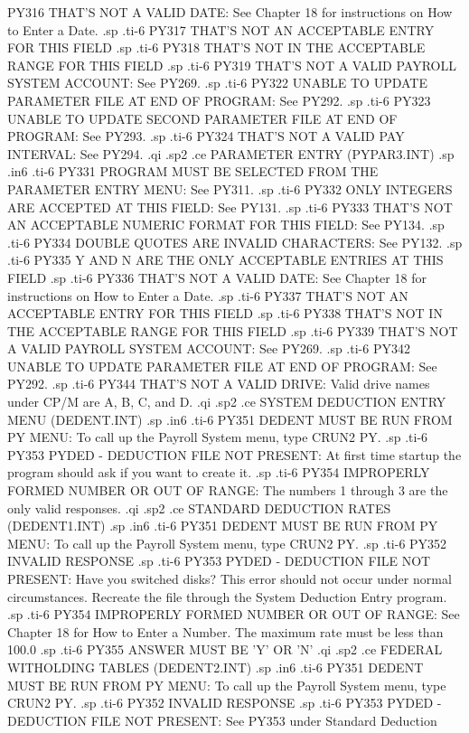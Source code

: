 PY316 THAT'S NOT A VALID DATE: See Chapter 18 for instructions on How
to Enter a Date.
.sp
.ti-6
PY317 THAT'S NOT AN ACCEPTABLE ENTRY FOR THIS FIELD
.sp
.ti-6
PY318 THAT'S NOT IN THE ACCEPTABLE RANGE FOR THIS FIELD
.sp
.ti-6
PY319 THAT'S NOT A VALID PAYROLL SYSTEM ACCOUNT: See PY269.
.sp
.ti-6
PY322 UNABLE TO UPDATE PARAMETER FILE AT END OF PROGRAM: See PY292.
.sp
.ti-6
PY323 UNABLE TO UPDATE SECOND PARAMETER FILE AT END OF PROGRAM: See PY293.
.sp
.ti-6
PY324 THAT'S NOT A VALID PAY INTERVAL: See PY294.
.qi
.sp2
.ce
PARAMETER ENTRY (PYPAR3.INT)
.sp
.in6
.ti-6
PY331 PROGRAM MUST BE SELECTED FROM THE PARAMETER ENTRY MENU: See PY311.
.sp
.ti-6
PY332 ONLY INTEGERS ARE ACCEPTED AT THIS FIELD: See PY131.
.sp
.ti-6
PY333 THAT'S NOT AN ACCEPTABLE NUMERIC FORMAT FOR THIS FIELD: See PY134.
.sp
.ti-6
PY334 DOUBLE QUOTES ARE INVALID CHARACTERS: See PY132.
.sp
.ti-6
PY335 Y  AND  N  ARE THE ONLY ACCEPTABLE ENTRIES AT THIS FIELD
.sp
.ti-6
PY336 THAT'S NOT A VALID DATE: See Chapter 18 for instructions on How
to Enter a Date.
.sp
.ti-6
PY337 THAT'S NOT AN ACCEPTABLE ENTRY FOR THIS FIELD
.sp
.ti-6
PY338 THAT'S NOT IN THE ACCEPTABLE RANGE FOR THIS FIELD
.sp
.ti-6
PY339 THAT'S NOT A VALID PAYROLL SYSTEM ACCOUNT: See PY269.
.sp
.ti-6
PY342 UNABLE TO UPDATE PARAMETER FILE AT END OF PROGRAM: See PY292.
.sp
.ti-6
PY344 THAT'S NOT A VALID DRIVE: Valid drive names under CP/M are A, B,
C, and D.
.qi
.sp2
.ce
SYSTEM DEDUCTION ENTRY MENU (DEDENT.INT)
.sp
.in6
.ti-6
PY351 DEDENT MUST BE RUN FROM PY MENU: To call up the Payroll System menu,
type CRUN2 PY.
.sp
.ti-6
PY353 PYDED - DEDUCTION FILE NOT PRESENT: At first time startup
the program should ask if you want
to create it.
.sp
.ti-6
PY354 IMPROPERLY FORMED NUMBER OR OUT OF RANGE: The numbers 1 through
3 are the only valid responses.
.qi
.sp2
.ce
STANDARD DEDUCTION RATES (DEDENT1.INT)
.sp
.in6
.ti-6
PY351 DEDENT MUST BE RUN FROM PY MENU: To call up the Payroll System menu,
type CRUN2 PY.
.sp
.ti-6
PY352 INVALID RESPONSE
.sp
.ti-6
PY353 PYDED - DEDUCTION FILE NOT PRESENT: Have you switched disks?  This
error should not occur under normal circumstances.  Recreate the file through
the System Deduction Entry program.
.sp
.ti-6
PY354 IMPROPERLY FORMED NUMBER OR OUT OF RANGE: See Chapter 18 for How to
Enter a Number.  The maximum rate must be less than 100.0%
.sp
.ti-6
PY355 ANSWER MUST BE 'Y' OR 'N'
.qi
.sp2
.ce
FEDERAL WITHOLDING TABLES (DEDENT2.INT)
.sp
.in6
.ti-6
PY351 DEDENT MUST BE RUN FROM PY MENU: To call up the Payroll System menu,
type CRUN2 PY.
.sp
.ti-6
PY352 INVALID RESPONSE
.sp
.ti-6
PY353 PYDED - DEDUCTION FILE NOT PRESENT: See PY353 under Standard Deduction
